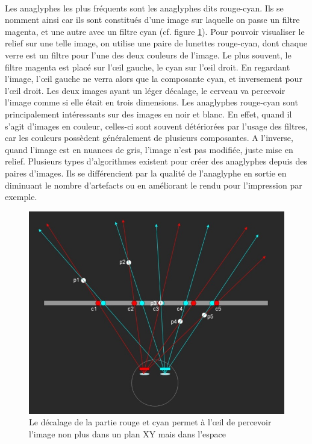 \paragraph{}
	Les anaglyphes les plus fréquents sont les anaglyphes dits rouge-cyan. Ils se nomment ainsi car ils sont constitués d’une image sur laquelle on passe un filtre magenta, et une autre avec un filtre cyan (cf. figure \ref{fig:anaglyph}). Pour pouvoir visualiser le relief sur une telle image, on utilise une paire de lunettes rouge-cyan, dont chaque verre est un filtre pour l’une des deux couleurs de l’image. Le plus souvent, le filtre magenta est placé sur l’œil gauche, le cyan sur l’œil droit. En regardant l’image, l’œil gauche ne verra alors que la composante cyan, et inversement pour l’œil droit. Les deux images ayant un léger décalage, le cerveau va percevoir l’image comme si elle était en trois dimensions. Les anaglyphes rouge-cyan sont principalement intéressants sur des images en noir et blanc. En effet, quand il s’agit d’images en couleur, celles-ci sont souvent détériorées par l’usage des filtres, car les couleurs possèdent généralement de plusieurs composantes. A l’inverse, quand l’image est en nuances de gris, l’image n’est pas modifiée, juste mise en relief. Plusieurs types d'algorithmes existent pour créer des anaglyphes depuis des paires d'images. Ils se différencient par la qualité de l'anaglyphe en sortie en diminuant le nombre d'artefacts \cite{steteroAnaglyph} ou en améliorant le rendu pour l'impression \cite{printAnaglyph} par exemple.

\begin{figure}[h]
		\centering
		\includegraphics[scale=0.8]{anaglyph.png}
		\caption{\label{fig:anaglyph} Le décalage de la partie rouge et cyan permet à l’œil de percevoir l’image non plus dans un plan XY mais dans l’espace \protect \footnotemark }
\end{figure}

